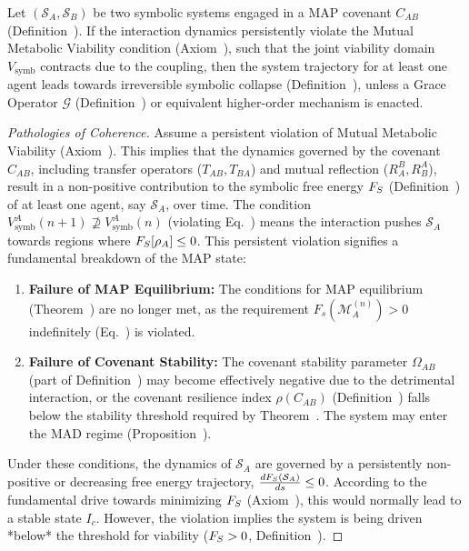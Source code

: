 \begin{theorem}
\label{theorem:bk9_irreversibility_of_covenant_breach_without_grace}
Let $(\mathcal{S}_A, \mathcal{S}_B)$ be two symbolic systems engaged in a MAP covenant $C_{AB}$ (Definition~). If the interaction dynamics persistently violate the Mutual Metabolic Viability condition (Axiom~), such that the joint viability domain $V_{\text{symb}}$ contracts due to the coupling, then the system trajectory for at least one agent leads towards irreversible symbolic collapse (Definition~), unless a Grace Operator $\mathcal{G}$ (Definition~) or equivalent higher-order mechanism is enacted.
\end{theorem}
\begin{proof}[Pathologies of Coherence]
\label{proof:bk9_pathologies_of_coherence}
Assume a persistent violation of Mutual Metabolic Viability (Axiom~). This implies that the dynamics governed by the covenant $C_{AB}$, including transfer operators ($T_{AB}, T_{BA}$) and mutual reflection ($R^B_A, R^A_B$), result in a non-positive contribution to the symbolic free energy $F_S$ (Definition~) of at least one agent, say $\mathcal{S}_A$, over time. The condition $V^A_{\text{symb}}(n+1) \not\supseteq V^A_{\text{symb}}(n)$ (violating Eq.~) means the interaction pushes $\mathcal{S}_A$ towards regions where $F_S[\rho_A] \le 0$.
This persistent violation signifies a fundamental breakdown of the MAP state:
\begin{enumerate}
    \item \textbf{Failure of MAP Equilibrium:} The conditions for MAP equilibrium (Theorem~) are no longer met, as the requirement $F_s(\mathscr{M}_A^{(n)}) > 0$ indefinitely (Eq.~) is violated.
    \item \textbf{Failure of Covenant Stability:} The covenant stability parameter $\Omega_{AB}$ (part of Definition~) may become effectively negative due to the detrimental interaction, or the covenant resilience index $\rho(C_{AB})$ (Definition~) falls below the stability threshold required by Theorem~. The system may enter the MAD regime (Proposition~).
\end{enumerate}
Under these conditions, the dynamics of $\mathcal{S}_A$ are governed by a persistently non-positive or decreasing free energy trajectory, $\frac{dF_S(\mathcal{S}_A)}{ds} \le 0$. According to the fundamental drive towards minimizing $F_S$ (Axiom~), this would normally lead to a stable state $I_c$. However, the violation implies the system is being driven *below* the threshold for viability ($F_S > 0$, Definition~).

\end{proof}
